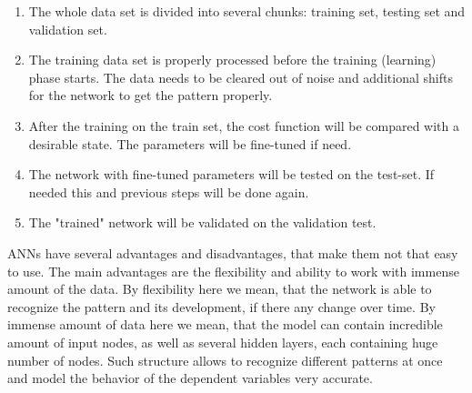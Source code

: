 \documentclass[12pt, a4paper]{article}
\begin{document}
\begin{enumerate}
	\item The whole data set is divided into several chunks: training set, testing set and validation set. 
	\item The training data set is properly processed before the training (learning) phase starts. The data needs to be cleared out of noise and additional shifts for the network to get the pattern properly.
	\item After the training on the train set, the cost function will be compared with a desirable state. The parameters will be fine-tuned if need.
	\item The network with fine-tuned parameters will be tested on the test-set. If needed this and previous steps will be done again.
	\item The "trained" network will be validated on the validation test.
\end{enumerate}
ANNs have several advantages and disadvantages, that make them not that easy to use. The main advantages are the flexibility and ability to work with immense amount of the data. By flexibility here we mean, that the network is able to recognize the pattern and its development, if there any change over time. By immense amount of data here we mean, that the model can contain incredible amount of input nodes, as well as several hidden layers, each containing huge number of nodes. Such structure allows to recognize different patterns at once and model the behavior of the dependent variables very accurate.\\
\end{document}
